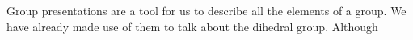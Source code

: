 \documentclass[./main.tex]{subfiles}
\begin{document}
Group presentations are a tool for us to describe all the elements of a group.
We have already made use of them to talk about the dihedral group. Although 
\end{document}
